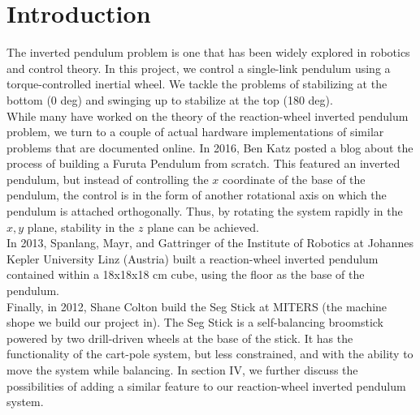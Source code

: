 \documentclass[conference]{IEEEtran}
\begin{document}
\section{Introduction}
The inverted pendulum problem is one that has been widely explored in robotics and control theory. In this project, we control a single-link pendulum using a torque-controlled inertial wheel. We tackle the problems of stabilizing at the bottom (0 deg) and swinging up to stabilize at the top (180 deg). \\ \indent
While many have worked on the theory of the reaction-wheel inverted pendulum problem, we turn to a couple of actual hardware implementations of similar problems that are documented online. In 2016, Ben Katz posted a blog about the process of building a Furuta Pendulum from scratch. This featured an inverted pendulum, but instead of controlling the $x$ coordinate of the base of the pendulum, the control is in the form of another rotational axis on which the pendulum is attached orthogonally. Thus, by rotating the system rapidly in the $x, y$ plane, stability in the $z$ plane can be achieved.\\ \indent
In 2013, Spanlang, Mayr, and Gattringer of the Institute of Robotics at Johannes Kepler University Linz (Austria) built a reaction-wheel inverted pendulum contained within a 18x18x18 cm cube, using the floor as the base of the pendulum. \\ \indent
Finally, in 2012, Shane Colton build the Seg Stick at MITERS (the machine shope we build our project in). The Seg Stick is a self-balancing broomstick powered by two drill-driven wheels at the base of the stick. It has the functionality of the cart-pole system, but less constrained, and with the ability to move the system while balancing. In section IV, we further discuss the possibilities of adding a similar feature to our reaction-wheel inverted pendulum system.





\end{document}
